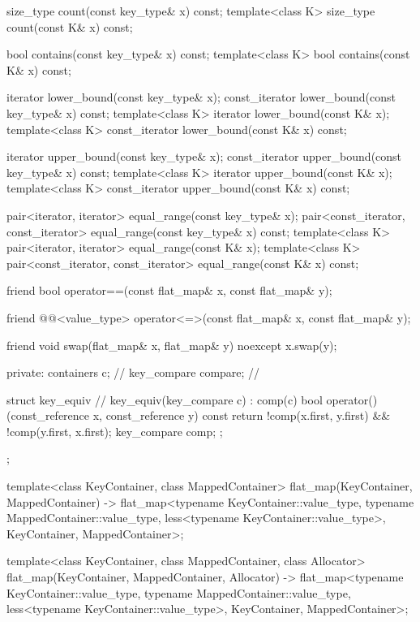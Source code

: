 \begin{codeblock}
{{    size_type count(const key_type& x) const;
    template<class K> size_type count(const K& x) const;

    bool contains(const key_type& x) const;
    template<class K> bool contains(const K& x) const;

    iterator lower_bound(const key_type& x);
    const_iterator lower_bound(const key_type& x) const;
    template<class K> iterator lower_bound(const K& x);
    template<class K> const_iterator lower_bound(const K& x) const;

    iterator upper_bound(const key_type& x);
    const_iterator upper_bound(const key_type& x) const;
    template<class K> iterator upper_bound(const K& x);
    template<class K> const_iterator upper_bound(const K& x) const;

    pair<iterator, iterator> equal_range(const key_type& x);
    pair<const_iterator, const_iterator> equal_range(const key_type& x) const;
    template<class K> pair<iterator, iterator> equal_range(const K& x);
    template<class K> pair<const_iterator, const_iterator> equal_range(const K& x) const;

    friend bool operator==(const flat_map& x, const flat_map& y);

    friend @@<value_type>
      operator<=>(const flat_map& x, const flat_map& y);

    friend void swap(flat_map& x, flat_map& y) noexcept
      { x.swap(y); }

  private:
    containers c;               // \expos
    key_compare compare;        // \expos

    struct key_equiv {  // \expos
      key_equiv(key_compare c) : comp(c) { }
      bool operator()(const_reference x, const_reference y) const {
        return !comp(x.first, y.first) && !comp(y.first, x.first);
      }
      key_compare comp;
    };
  };

  template<class KeyContainer, class MappedContainer>
    flat_map(KeyContainer, MappedContainer)
      -> flat_map<typename KeyContainer::value_type, typename MappedContainer::value_type,
                  less<typename KeyContainer::value_type>, KeyContainer, MappedContainer>;

  template<class KeyContainer, class MappedContainer, class Allocator>
    flat_map(KeyContainer, MappedContainer, Allocator)
      -> flat_map<typename KeyContainer::value_type, typename MappedContainer::value_type,
                  less<typename KeyContainer::value_type>, KeyContainer, MappedContainer>;

}
\end{codeblock}
